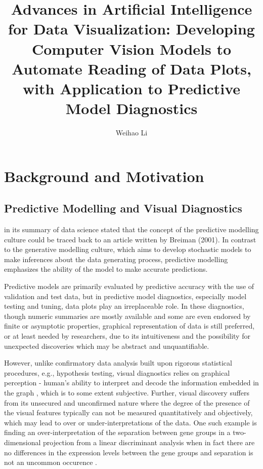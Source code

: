 \documentclass{monashthesis}
\author{Weihao Li}
\title{Advances in Artificial Intelligence for Data Visualization: Developing Computer Vision Models to Automate Reading of Data Plots, with Application to Predictive Model Diagnostics}
\theoremstyle{definition}
\theoremstyle{definition}
\theoremstyle{definition}
\theoremstyle{definition}
\theoremstyle{remark}
\begin{document}

\titlepage

{\sf\tighttoc\doublespacing}

\clearpage{}\setcounter{page}{0}

\hypertarget{background-and-motivation}{%
\chapter{Background and Motivation}\label{background-and-motivation}}

\hypertarget{se:predictive-modelling}{%
\section{Predictive Modelling and Visual Diagnostics}\label{se:predictive-modelling}}

\textcite{donoho_50_2017} in its summary of data science stated that the concept of the predictive modelling culture could be traced back to an article written by Breiman (2001). In contrast to the generative modelling culture, which aims to develop stochastic models to make inferences about the data generating process, predictive modelling emphasizes the ability of the model to make accurate predictions.

Predictive models are primarily evaluated by predictive accuracy with the use of validation and test data, but in predictive model diagnostics, especially model testing and tuning, data plots play an irreplaceable role. In these diagnostics, though numeric summaries are mostly available and some are even endorsed by finite or asymptotic properties, graphical representation of data is still preferred, or at least needed by researchers, due to its intuitiveness and the possibility for unexpected discoveries which may be abstract and unquantifiable.

However, unlike confirmatory data analysis built upon rigorous statistical procedures, e.g., hypothesis testing, visual diagnostics relies on graphical perception - human's ability to interpret and decode the information embedded in the graph \autocite{cleveland_graphical_1984}, which is to some extent subjective. Further, visual discovery suffers from its unsecured and unconfirmed nature where the degree of the presence of the visual features typically can not be measured quantitatively and objectively, which may lead to over or under-interpretations of the data. One such example is finding an over-interpretation of the separation between gene groups in a two-dimensional projection from a linear discriminant analysis when in fact there are no differences in the expression levels between the gene groups and separation is not an uncommon occurence \autocite{roy_chowdhury_using_2015}.
\end{document}
